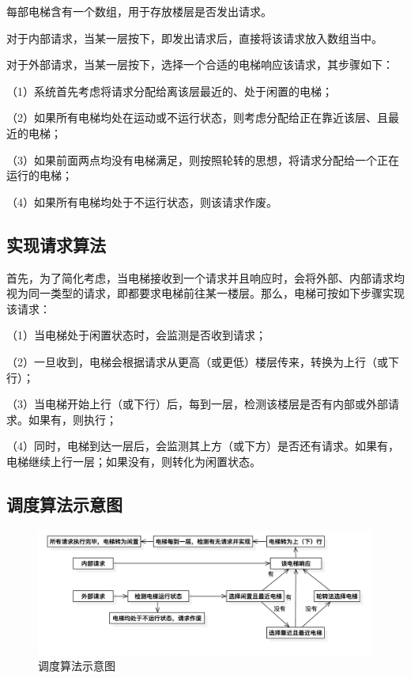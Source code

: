 \documentclass{article}
\begin{document}
\begin{CJK}{UTF8}{gbsn}
每部电梯含有一个数组，用于存放楼层是否发出请求。

对于内部请求，当某一层按下，即发出请求后，直接将该请求放入数组当中。

\clearpage

对于外部请求，当某一层按下，选择一个合适的电梯响应该请求，其步骤如下：

（1）系统首先考虑将请求分配给离该层最近的、处于闲置的电梯；

（2）如果所有电梯均处在运动或不运行状态，则考虑分配给正在靠近该层、且最近的电梯；

（3）如果前面两点均没有电梯满足，则按照轮转的思想，将请求分配给一个正在运行的电梯；

（4）如果所有电梯均处于不运行状态，则该请求作废。

\subsection{实现请求算法}

首先，为了简化考虑，当电梯接收到一个请求并且响应时，会将外部、内部请求均视为同一类型的请求，即都要求电梯前往某一楼层。那么，电梯可按如下步骤实现该请求：

（1）当电梯处于闲置状态时，会监测是否收到请求；

（2）一旦收到，电梯会根据请求从更高（或更低）楼层传来，转换为上行（或下行）；

（3）当电梯开始上行（或下行）后，每到一层，检测该楼层是否有内部或外部请求。如果有，则执行；

（4）同时，电梯到达一层后，会监测其上方（或下方）是否还有请求。如果有，电梯继续上行一层；如果没有，则转化为闲置状态。


\subsection{调度算法示意图}


\begin{figure}[!h]
\centering
\includegraphics[width=1.1\textwidth]{1.jpg}
\caption{调度算法示意图}
\end{figure}



\end{CJK}
\end{document}

